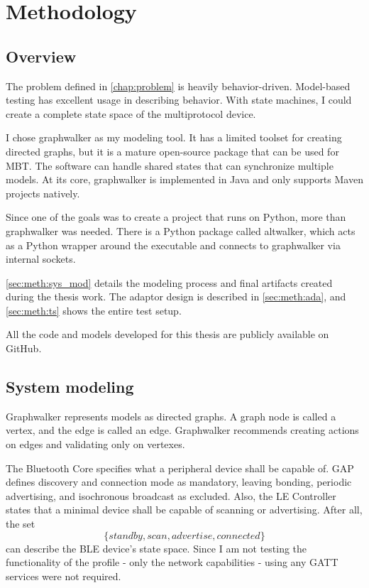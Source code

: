 \chapter{Methodology}
\label{chap:methodology}

\section{Overview}
\label{sec:meth:ov}

The problem defined in \autoref{chap:problem} is heavily behavior-driven. Model-based testing has excellent usage in describing behavior. With state machines, I could create a complete state space of the multiprotocol device.

I chose graphwalker as my modeling tool. It has a limited toolset for creating directed graphs, but it is a mature open-source package that can be used for MBT. The software can handle shared states that can synchronize multiple models. At its core, graphwalker is implemented in Java and only supports Maven projects natively. 

Since one of the goals was to create a project that runs on Python, more than graphwalker was needed. There is a Python package called altwalker, which acts as a Python wrapper around the executable and connects to graphwalker via internal sockets.

\autoref{sec:meth:sys_mod} details the modeling process and final artifacts created during the thesis work. The adaptor design is described in \autoref{sec:meth:ada}, and \autoref{sec:meth:ts} shows the entire test setup.

All the code and models developed for this thesis are publicly available on GitHub\cite{mis_github}.


\section{System modeling}
\label{sec:meth:sys_mod}

Graphwalker represents models as directed graphs. A graph node is called a vertex, and the edge is called an edge. Graphwalker recommends creating actions on edges and validating only on vertexes.

The Bluetooth Core specifies what a peripheral device shall be capable of. GAP defines discovery and connection mode as mandatory, leaving bonding, periodic advertising, and isochronous broadcast as excluded. Also, the LE Controller states that a minimal device shall be capable of scanning or advertising. After all, the set \[
    \{standby, scan, advertise, connected\}  
\] can describe the BLE device's state space. Since I am not testing the functionality of the profile - only the network capabilities - using any GATT services were not required.

